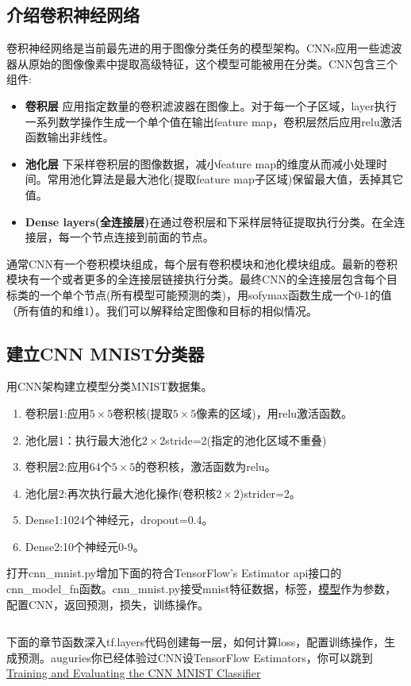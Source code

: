 \subsection{介绍卷积神经网络}
卷积神经网络是当前最先进的用于图像分类任务的模型架构。CNNs应用一些滤波器从原始的图像像素中提取高级特征，这个模型可能被用在分类。CNN包含三个组件:
\begin{itemize}
  \item \textbf{卷积层} 应用指定数量的卷积滤波器在图像上。对于每一个子区域，layer执行一系列数学操作生成一个单个值在输出feature map，卷积层然后应用relu激活函数输出非线性。
  \item \textbf{池化层} 下采样卷积层的图像数据，减小feature map的维度从而减小处理时间。常用池化算法是最大池化(提取feature map子区域)保留最大值，丢掉其它值。
  \item \textbf{Dense layers(全连接层)}在通过卷积层和下采样层特征提取执行分类。在全连接层，每一个节点连接到前面的节点。
\end{itemize}
通常CNN有一个卷积模块组成，每个层有卷积模块和池化模块组成。最新的卷积模块有一个或者更多的全连接层链接执行分类。最终CNN的全连接层包含每个目标类的一个单个节点(所有模型可能预测的类)，用sofymax函数生成一个0-1的值（所有值的和维1）。我们可以解释给定图像和目标的相似情况。
\subsection{建立CNN MNIST分类器}
用CNN架构建立模型分类MNIST数据集。
\begin{enumerate}
  \item 卷积层1:应用$5\times5$卷积核(提取$5\times5$像素的区域)，用relu激活函数。
  \item 池化层1：执行最大池化$2\times2$stride=2(指定的池化区域不重叠)
  \item 卷积层2:应用64个$5\times5$的卷积核，激活函数为relu。
  \item 池化层2:再次执行最大池化操作(卷积核$2\times2$)strider=2。
  \item Dense1:1024个神经元，dropout=0.4。
  \item Dense2:10个神经元0-9。
\end{enumerate}
打开cnn\_mnist.py增加下面的符合TensorFlow's Estimator api接口的cnn\_model\_fn函数。cnn\_mnist.py接受mnist特征数据，标签，\href{https://www.tensorflow.org/api_docs/python/tf/estimator/ModeKeys}{模型}作为参数，配置CNN，返回预测，损失，训练操作。
\begin{lstlisting}[language=Python]

\end{lstlisting}
下面的章节函数深入tf.layers代码创建每一层，如何计算loss，配置训练操作，生成预测。auguries你已经体验过CNN设TensorFlow Estimators，你可以跳到\href{https://www.tensorflow.org/tutorials/layers#training-and-evaluating-the-cnn-mnist-classifier}{Training and Evaluating the CNN MNIST Classifier}
